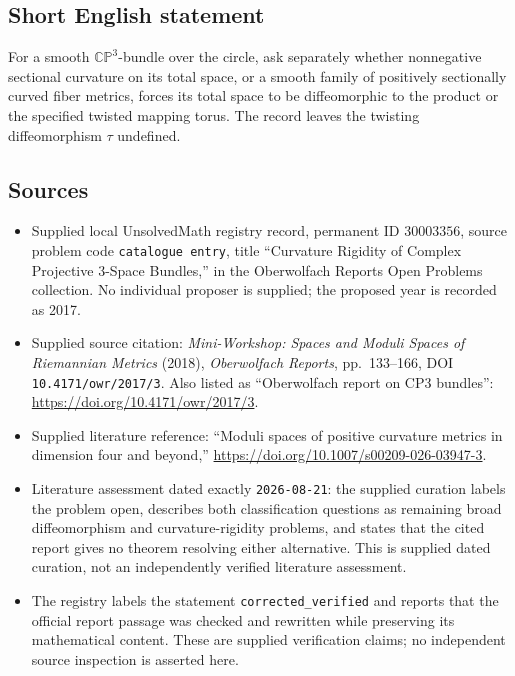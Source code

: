 \documentclass[11pt]{article}
\begin{document}
\subsection{Short English statement}
For a smooth \(\mathbb{CP}^{3}\)-bundle over the circle, ask separately whether nonnegative sectional curvature on its total space, or a smooth family of positively sectionally curved fiber metrics, forces its total space to be diffeomorphic to the product or the specified twisted mapping torus. The record leaves the twisting diffeomorphism \(\tau\) undefined.
\subsection{Sources}
\begin{itemize}
\item Supplied local UnsolvedMath registry record, permanent ID \(30003356\), source problem code \texttt{catalogue entry}, title ``Curvature Rigidity of Complex Projective 3-Space Bundles,'' in the Oberwolfach Reports Open Problems collection. No individual proposer is supplied; the proposed year is recorded as 2017.
\item Supplied source citation: \emph{Mini-Workshop: Spaces and Moduli Spaces of Riemannian Metrics} (2018), \emph{Oberwolfach Reports}, pp.\ 133--166, DOI \texttt{10.4171/owr/2017/3}. Also listed as ``Oberwolfach report on CP3 bundles'': \url{https://doi.org/10.4171/owr/2017/3}.
\item Supplied literature reference: ``Moduli spaces of positive curvature metrics in dimension four and beyond,'' \url{https://doi.org/10.1007/s00209-026-03947-3}.
\item Literature assessment dated exactly \texttt{2026-08-21}: the supplied curation labels the problem open, describes both classification questions as remaining broad diffeomorphism and curvature-rigidity problems, and states that the cited report gives no theorem resolving either alternative. This is supplied dated curation, not an independently verified literature assessment.
\item The registry labels the statement \texttt{corrected\_verified} and reports that the official report passage was checked and rewritten while preserving its mathematical content. These are supplied verification claims; no independent source inspection is asserted here.
\end{itemize}
\end{document}
